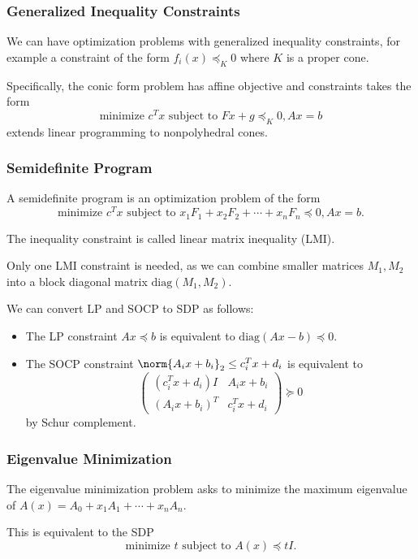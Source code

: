 \documentclass[11pt]{article}
\begin{document}
\subsubsection*{Generalized Inequality Constraints} 
We can have optimization problems with generalized inequality constraints, for example a constraint of the form $f_i(x) \preceq_K 0$ where $K$ is a proper cone. \par
Specifically, the conic form problem has affine objective and constraints takes the form 
\[ \text{minimize } c^Tx \text{ subject to } Fx+g \preceq_K 0, Ax=b \] 
extends linear programming to nonpolyhedral cones.

\subsubsection*{Semidefinite Program}
A semidefinite program is an optimization problem of the form 
\[ \text{minimize } c^Tx \text{ subject to } x_1F_1 + x_2F_2 + \cdots + x_nF_n \preceq 0, Ax=b. \] 

The inequality constraint is called linear matrix inequality (LMI). \par 
Only one LMI constraint is needed, as we can combine smaller matrices $M_1, M_2$ into a block diagonal matrix $\mathrm{diag}(M_1, M_2)$. \par 

We can convert LP and SOCP to SDP as follows: 
\begin{itemize}
    \item The LP constraint $Ax \preceq b$ is equivalent to $\mathrm{diag}(Ax - b) \preceq 0$. 
    \item The SOCP constraint $\norm{A_ix + b_i}_2 \leq c_i^Tx + d_i$ is equivalent to 
    \[ \begin{pmatrix}
        (c_i^Tx + d_i)I & A_ix + b_i \\
        (A_ix + b_i)^T & c_i^Tx + d_i
    \end{pmatrix} \succeq 0 \] 
    by Schur complement.
\end{itemize}

\subsubsection*{Eigenvalue Minimization}
The eigenvalue minimization problem asks to minimize the maximum eigenvalue of $A(x) = A_0 + x_1A_1 + \cdots + x_nA_n$. \par 

This is equivalent to the SDP 
\[ \text{minimize } t \text{ subject to } A(x) \preceq tI. \] 
\end{document}
